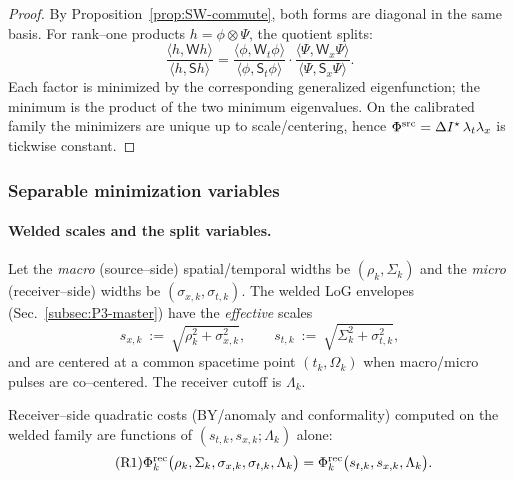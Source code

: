 \documentclass[10pt]{article}
\theoremstyle{definition}
\theoremstyle{plain}
\begin{document}
\begin{proof}
By Proposition~\ref{prop:SW-commute}, both forms are diagonal in the same basis. For rank–one
products $h=\phi\otimes\Psi$, the quotient splits:
\[
\frac{\langle h,\mathsf W h\rangle}{\langle h,\mathsf S h\rangle}
=\frac{\langle \phi,\mathsf W_t\phi\rangle}{\langle \phi,\mathsf S_t\phi\rangle}\cdot
 \frac{\langle \Psi,\mathsf W_x\Psi\rangle}{\langle \Psi,\mathsf S_x\Psi\rangle}.
\]
Each factor is minimized by the corresponding generalized eigenfunction; the minimum is the
product of the two minimum eigenvalues. On the calibrated family the minimizers are unique up to
scale/centering, hence $\Phi^{\rm src}=\Delta I^\star\,\lambda_t\lambda_x$ is tickwise constant.
\end{proof}

\subsubsection*{Separable minimization variables}
\label{subsubsec:separable-splits-centering}

\paragraph{Welded scales and the split variables.}\label{par:uom-main-055}
Let the \emph{macro} (source–side) spatial/temporal widths be \((\rho_k,\Sigma_k)\) and the \emph{micro} (receiver–side) widths be \((\sigma_{x,k},\sigma_{t,k})\).
The welded LoG envelopes (Sec.~\ref{subsec:P3-master}) have the \emph{effective} scales
\[
s_{x,k}\ :=\ \sqrt{\rho_k^2+\sigma_{x,k}^2},
\qquad
s_{t,k}\ :=\ \sqrt{\Sigma_k^2+\sigma_{t,k}^2},
\]
and are centered at a common spacetime point \((t_k,\Omega_k)\) when macro/micro pulses are co–centered.
The receiver cutoff is \(\Lambda_k\).

\medskip
\noindent
Receiver–side quadratic costs (BY/anomaly and conformality) computed on the welded family are functions of \((s_{t,k},s_{x,k};\Lambda_k)\) alone:
\begin{equation}
\tag{R1}
\label{eq:R1}
\Phi^{\rm rec}_k\big(\rho_k,\Sigma_k,\sigma_{x,k},\sigma_{t,k},\Lambda_k\big)
=\Phi^{\rm rec}_k\big(s_{t,k},s_{x,k},\Lambda_k\big).
\end{equation}
\end{document}
